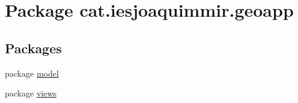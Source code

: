 \hypertarget{namespacecat_1_1iesjoaquimmir_1_1geoapp}{}\section{Package cat.\+iesjoaquimmir.\+geoapp}
\label{namespacecat_1_1iesjoaquimmir_1_1geoapp}
\subsection*{Packages}
\begin{DoxyCompactItemize}
\item 
package \mbox{\hyperlink{namespacecat_1_1iesjoaquimmir_1_1geoapp_1_1model}{model}}
\item 
package \mbox{\hyperlink{namespacecat_1_1iesjoaquimmir_1_1geoapp_1_1views}{views}}
\end{DoxyCompactItemize}
